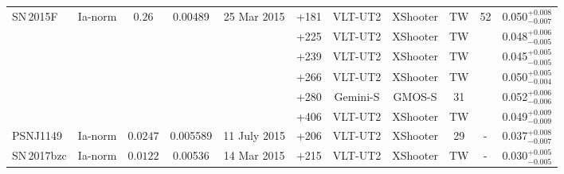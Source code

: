 \documentclass[fleqn,usenatbib]{mnras}
\begin{document}
\begin{table}
{\begin{tabular}{l c c cccccccc}
    SN\,2015F  & Ia-norm   & $0.26$    & 0.00489   & 25 Mar 2015  & +181   & VLT-UT2  & XShooter     & TW & 52& 0.050$^{+0.008}_{-0.007}$ \\
             &           &           &          &              & +225   & VLT-UT2  & XShooter     & TW &   & 0.048$^{+0.006}_{-0.005}$ \\
             &           &           &          &              & +239   & VLT-UT2  & XShooter     & TW &   & 0.045$^{+0.005}_{-0.005}$ \\
             &           &           &          &              & +266   & VLT-UT2  & XShooter     & TW &   & 0.050$^{+0.005}_{-0.004}$ \\
             &           &           &          &              & +280   & Gemini-S & GMOS-S        & 31 &   & 0.052$^{+0.006}_{-0.006}$ \\
             &           &           &          &              & +406   & VLT-UT2  & XShooter     & TW &   & 0.049$^{+0.009}_{-0.009}$ \\
    PSNJ1149 & Ia-norm   & $0.0247$  & 0.005589 & 11 July 2015 & +206   & VLT-UT2  & XShooter     & 29& -  & 0.037$^{+0.008}_{-0.007}$ \\
    SN\,2017bzc& Ia-norm   & $0.0122$  & 0.00536 & 14 Mar 2015  & +215   & VLT-UT2  & XShooter     & TW & - & 0.030$^{+0.005}_{-0.005}$ \\


\end{tabular}}
\end{table}
\end{document}
